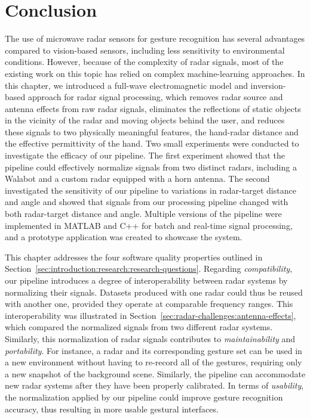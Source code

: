 \section{Conclusion} \label{sec:radar-challenges:conclusion}
The use of microwave radar sensors for gesture recognition has several advantages compared to vision-based sensors, including less sensitivity to environmental conditions. However, because of the complexity of radar signals, most of the existing work on this topic has relied on complex machine-learning approaches.
%
In this chapter, we introduced a full-wave electromagnetic model and inversion-based approach for radar signal processing, which removes radar source and antenna effects from raw radar signals, eliminates the reflections of static objects in the vicinity of the radar and moving objects behind the user, and reduces these signals to two physically meaningful features, the hand-radar distance and the effective permittivity of the hand.
%
Two small experiments were conducted to investigate the efficacy of our pipeline.
The first experiment showed that the pipeline could effectively normalize signals from two distinct radars, including a Walabot and a custom radar equipped with a horn antenna.
The second investigated the sensitivity of our pipeline to variations in radar-target distance and angle and showed that signals from our processing pipeline changed with both radar-target distance and angle.    
Multiple versions of the pipeline were implemented in MATLAB and C++ for batch and real-time signal processing, and a prototype application was created to showcase the system. 

This chapter addresses the four software quality properties outlined in Section~\ref{sec:introduction:research:research-questions}.
%
Regarding \textit{compatibility}, our pipeline introduces a degree of interoperability between radar systems by normalizing their signals. Datasets produced with one radar could thus be reused with another one, provided they operate at comparable frequency ranges. This interoperability was illustrated in Section~\ref{sec:radar-challenges:antenna-effects}, which compared the normalized signals from two different radar systems.
%
Similarly, this normalization of radar signals contributes to \textit{maintainability} and \textit{portability}. For instance, a radar and its corresponding gesture set can be used in a new environment without having to re-record all of the gestures, requiring only a new snapshot of the background scene. Similarly, the pipeline can accommodate new radar systems after they have been properly calibrated. 
%
In terms of \textit{usability}, the normalization applied by our pipeline could improve gesture recognition accuracy, thus resulting in more usable gestural interfaces. 


